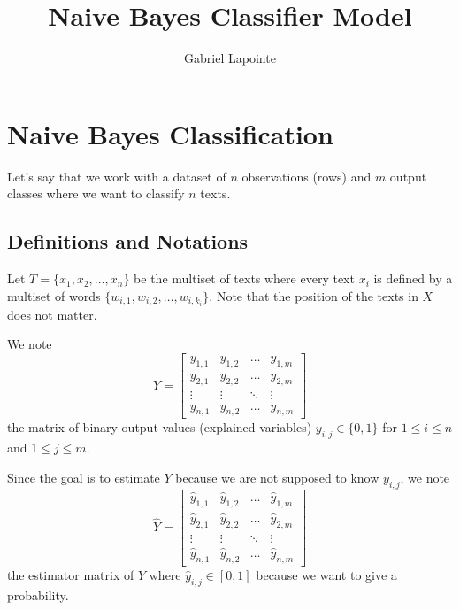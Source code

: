 \documentclass{article}
\title{Naive Bayes Classifier Model}
\author{Gabriel Lapointe}
\begin{document}
\section{Naive Bayes Classification}
Let's say that we work with a dataset of $n$ observations (rows) and $m$ output classes where we want to classify $n$ texts.

\subsection{Definitions and Notations}
Let $T = \{x_1,x_2,\ldots,x_n\}$ be the multiset of texts where every text $x_i$ is defined by a multiset of words $\{w_{i,1}, w_{i,2}, \ldots, w_{i,k_i}\}$. Note that the position of the texts in $X$ does not matter.

We note 
\begin{equation} \label{eq:ExplainedVariableMatrix}
Y =\begin{bmatrix}
	    y_{1,1}      & y_{1,2}      & \ldots & y_{1,m} \\
	    y_{2,1} & y_{2,2} & \ldots & y_{2,m} \\
	    \vdots       & \vdots        & \ddots & \vdots \\
	    y_{n,1}  & y_{n,2}  & \ldots & y_{n,m}
	\end{bmatrix}
\end{equation}
the matrix of binary output values (explained variables) $y_{i,j} \in \{0,1\}$ for $1 \leq i \leq n$ and $1 \leq j \leq m$.

Since the goal is to estimate $Y$ because we are not supposed to know $y_{i,j}$, we note 
\begin{equation} \label{eq:EstimatorMatrix}
\widehat{Y} =\begin{bmatrix}
	    \widehat{y}_{1,1}      & \widehat{y}_{1,2}      & \ldots & \widehat{y}_{1,m} \\
	    \widehat{y}_{2,1} & \widehat{y}_{2,2} & \ldots & \widehat{y}_{2,m} \\
	    \vdots       & \vdots        & \ddots & \vdots \\
	    \widehat{y}_{n,1}  & \widehat{y}_{n,2}  & \ldots & \widehat{y}_{n,m}
	\end{bmatrix}
\end{equation}
the estimator matrix of $Y$ where $\widehat{y}_{i,j} \in [0,1]$ because we want to give a probability.
\end{document}

